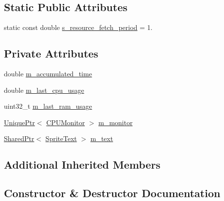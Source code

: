 \subsection*{Static Public Attributes}
\begin{DoxyCompactItemize}
\item 
static const double \hyperlink{classmage_1_1_system_usage_script_a1c6b08be09a34ebd4515f6c09622afbd}{s\+\_\+resource\+\_\+fetch\+\_\+period} = 1.
\end{DoxyCompactItemize}
\subsection*{Private Attributes}
\begin{DoxyCompactItemize}
\item 
double \hyperlink{classmage_1_1_system_usage_script_ab8df9ff99617df9010c4c2f27a6ff9c8}{m\+\_\+accumulated\+\_\+time}
\item 
double \hyperlink{classmage_1_1_system_usage_script_a4a49987cd15cdc2fa3d550a542191621}{m\+\_\+last\+\_\+cpu\+\_\+usage}
\item 
uint32\+\_\+t \hyperlink{classmage_1_1_system_usage_script_a64538d152d33546516a6acdda939b619}{m\+\_\+last\+\_\+ram\+\_\+usage}
\item 
\hyperlink{namespacemage_a8c307fbcc33bce9b7f2aa4c26c3b95cf}{Unique\+Ptr}$<$ \hyperlink{classmage_1_1_c_p_u_monitor}{C\+P\+U\+Monitor} $>$ \hyperlink{classmage_1_1_system_usage_script_a45574bef4a526bdd99108e92bf12dcbd}{m\+\_\+monitor}
\item 
\hyperlink{namespacemage_a1e01ae66713838a7a67d30e44c67703e}{Shared\+Ptr}$<$ \hyperlink{classmage_1_1_sprite_text}{Sprite\+Text} $>$ \hyperlink{classmage_1_1_system_usage_script_af6dd5e39889458ffb042f1d13fbcd7ea}{m\+\_\+text}
\end{DoxyCompactItemize}
\subsection*{Additional Inherited Members}


\subsection{Constructor \& Destructor Documentation}
\hypertarget{classmage_1_1_system_usage_script_a430d87647bdc6e407838863b1fcb750d}{}\label{classmage_1_1_system_usage_script_a430d87647bdc6e407838863b1fcb750d} 
